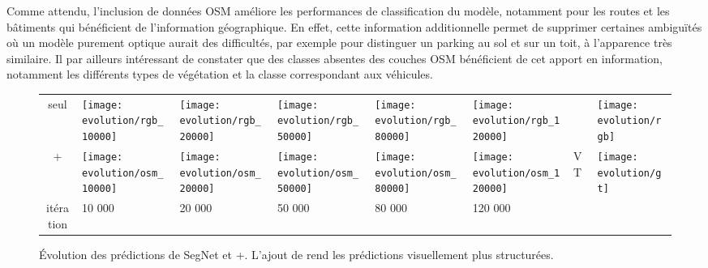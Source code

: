Comme attendu, l'inclusion de données \gls{OSM} améliore les performances de classification du modèle, notamment pour les routes et les bâtiments qui bénéficient de l'information géographique. En effet, cette information additionnelle permet de supprimer certaines ambiguïtés où un modèle purement optique aurait des difficultés, par exemple pour distinguer un parking au sol et sur un toit, à l'apparence très similaire. Il par ailleurs intéressant de constater que des classes absentes des couches \gls{OSM} bénéficient de cet apport en information, notamment les différents types de végétation et la classe correspondant aux véhicules.

\begin{figure}
\centering
\begin{tabularx}{0.95\textwidth}{c Y Y Y Y Y Y Y}
 seul &
\texttt{[image: evolution/rgb\_10000]} &
\texttt{[image: evolution/rgb\_20000]} &
\texttt{[image: evolution/rgb\_50000]} &
\texttt{[image: evolution/rgb\_80000]} &
\texttt{[image: evolution/rgb\_120000]} &
 &
\texttt{[image: evolution/rgb]} \\
 +  &
\texttt{[image: evolution/osm\_10000]} &
\texttt{[image: evolution/osm\_20000]} &
\texttt{[image: evolution/osm\_50000]} &
\texttt{[image: evolution/osm\_80000]} &
\texttt{[image: evolution/osm\_120000]} &
VT &
\texttt{[image: evolution/gt]} \\
itération & 10 000 & 20 000 & 50 000 & 80 000 & 120 000\\
\end{tabularx}
\caption[Évolution des prédictions de SegNet  et +.]{Évolution des prédictions de SegNet  et +. L'ajout de  rend les prédictions visuellement plus structurées.\\
\isprslegende}
\label{fig:training_evolution}
\end{figure}

